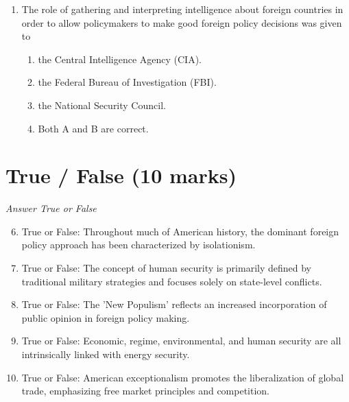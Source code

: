 \documentclass[12pt]{article}
\begin{document}
\begin{enumerate}[label=\arabic*.]
\begin{enumerate}[label=(\alph*)]
    \item Critical questioning.
    \item Realist logic.
    \item State-centric security analysis.
    \item All of these options.
\end{enumerate}
\item The role of gathering and interpreting intelligence about foreign countries in order to allow policymakers to make good foreign policy decisions was given to
\begin{enumerate}[label=(\alph*)]
    \item the Central Intelligence Agency (CIA).
    \item the Federal Bureau of Investigation (FBI).
    \item the National Security Council.
    \item Both A and B are correct.
\end{enumerate}
\end{enumerate}

\section*{True / False (10 marks)}
\textit{Answer True or False}
\begin{enumerate}[label=\arabic*.]
\setcounter{enumi}{5}
\item True or False: Throughout much of American history, the dominant foreign policy approach has been characterized by isolationism.
\item True or False: The concept of human security is primarily defined by traditional military strategies and focuses solely on state-level conflicts.
\item True or False: The 'New Populism' reflects an increased incorporation of public opinion in foreign policy making.
\item True or False: Economic, regime, environmental, and human security are all intrinsically linked with energy security.
\item True or False: American exceptionalism promotes the liberalization of global trade, emphasizing free market principles and competition.
\end{enumerate}
\end{document}
